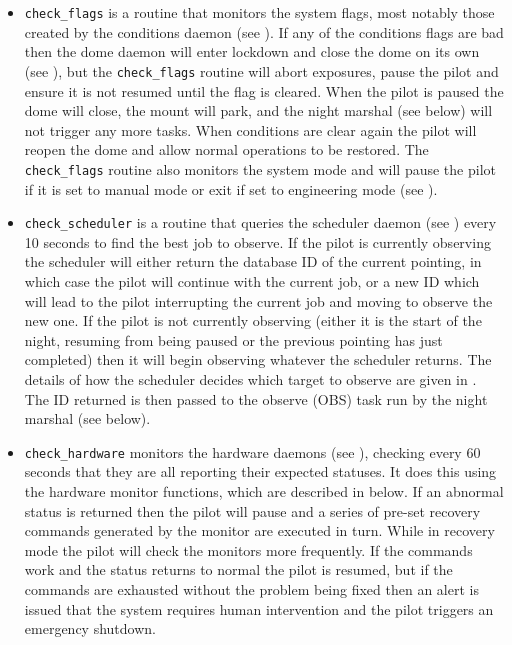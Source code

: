 \begin{colsection}
\begin{colsection}
\begin{itemize}

\item \texttt{check\_flags} is a routine that monitors the system flags, most notably those created by the conditions daemon (see ). If any of the conditions flags are bad then the dome daemon will enter lockdown and close the dome on its own (see ), but the \texttt{check\_flags} routine will abort exposures, pause the pilot and ensure it is not resumed until the flag is cleared. When the pilot is paused the dome will close, the mount will park, and the night marshal (see below) will not trigger any more tasks. When conditions are clear again the pilot will reopen the dome and allow normal operations to be restored. The \texttt{check\_flags} routine also monitors the system mode and will pause the pilot if it is set to manual mode or exit if set to engineering mode (see ).

\item \texttt{check\_scheduler} is a routine that queries the scheduler daemon (see ) every 10 seconds to find the best job to observe. If the pilot is currently observing the scheduler will either return the database ID of the current pointing, in which case the pilot will continue with the current job, or a new ID which will lead to the pilot interrupting the current job and moving to observe the new one. If the pilot is not currently observing (either it is the start of the night, resuming from being paused or the previous pointing has just completed) then it will begin observing whatever the scheduler returns. The details of how the scheduler decides which target to observe are given in . The ID returned is then passed to the observe (OBS) task run by the night marshal (see below).

\item \texttt{check\_hardware} monitors the hardware daemons (see ), checking every 60 seconds that they are all reporting their expected statuses. It does this using the hardware monitor functions, which are described in  below. If an abnormal status is returned then the pilot will pause and a series of pre-set recovery commands generated by the monitor are executed in turn. While in recovery mode the pilot will check the monitors more frequently. If the commands work and the status returns to normal the pilot is resumed, but if the commands are exhausted without the problem being fixed then an alert is issued that the system requires human intervention and the pilot triggers an emergency shutdown.


\end{itemize}
\end{colsection}
\end{colsection}
